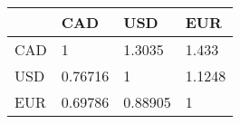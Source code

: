 \begin{tabular}{llll}
& CAD & USD & EUR \\ 
\hline 
CAD & 1 & 1.3035 & 1.433 \\ 
USD & 0.76716 & 1 & 1.1248 \\ 
EUR & 0.69786 & 0.88905 & 1 \\ 
\hline 
\end{tabular}